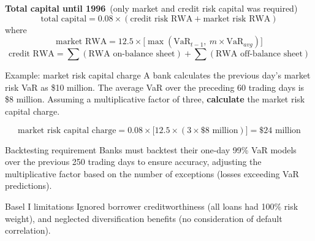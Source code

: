 \begin{orkeybox}
{\sffamily\bfseries\fontsize{8.6}{10}\selectfont\color{navy}Total capital until
1996}\ {\fontsize{8.8}{11}\selectfont\color{midgray}(only market and credit risk
capital was required)}
\[
\text{total capital}=0.08\times(\text{credit risk RWA}+\text{market risk RWA})
\]
where
\[
\text{market RWA}=12.5\times\bigl[\max(\mathrm{VaR}_{t-1},\ m\times\mathrm{VaR}_{avg})\bigr]
\]
\[
\text{credit RWA}=\textstyle\sum(\text{RWA on-balance sheet})+\sum(\text{RWA off-balance sheet})
\]
\end{orkeybox}

\begin{orexambox}{Example: market risk capital charge}
A bank calculates the previous day's market risk VaR as \$10 million. The average
VaR over the preceding 60 trading days is \$8 million. Assuming a multiplicative
factor of three, \textbf{calculate} the market risk capital charge.

\vspace{6pt}
\par
\[
\text{market risk capital charge}=0.08\times\bigl[12.5\times(3\times\$8\text{ million})\bigr]=\$24\text{ million}
\]
\end{orexambox}

\begin{ornotebox}{Backtesting requirement}
Banks must backtest their one-day 99\% VaR models over the previous 250 trading
days to ensure accuracy, adjusting the multiplicative factor based on the number of
exceptions (losses exceeding VaR predictions).
\end{ornotebox}


\begin{ornotebox}{Basel I limitations}
Ignored borrower creditworthiness (all loans had 100\% risk weight), and neglected
diversification benefits (no consideration of default correlation).
\end{ornotebox}


